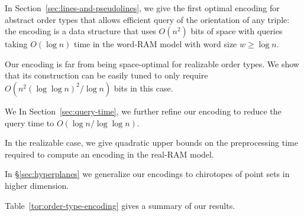 In Section~\ref{sec:lines-and-pseudolines}, we
give the first optimal encoding for abstract
order types that allows efficient query of the orientation of any triple: the
encoding is a data structure that uses \( O(n^2) \) bits of space with queries
taking \(O(\log n)\) time in the word-RAM model with word size \(w \geq \log
n\).

%
Our encoding is far from being space-optimal for realizable order types.
We show that its construction can be easily tuned to only require \(O(n^2
{(\log{\log{n}})}^2 / \log{n})\) bits in this case.

%
\ifeurocg%
We \else%
In Section~\ref{sec:query-time}, we \fi%
further refine our encoding to
reduce the query time to \(O(\log{n}/\log{\log{n}})\).


%
In the realizable case, we give quadratic upper bounds on the
preprocessing time required to compute an encoding in the real-RAM model.


%
In \S\ref{sec:hyperplanes} we
generalize our encodings to chirotopes of
point sets in higher dimension.



Table~\ref{tor:order-type-encoding} gives a summary of our results.

